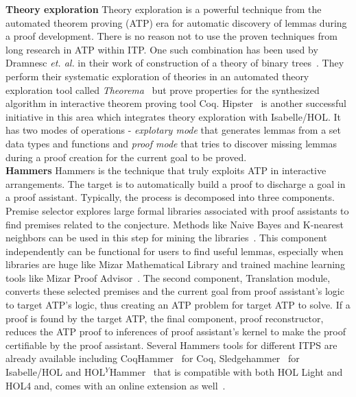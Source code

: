 \textbf{Theory exploration} Theory exploration is a powerful technique from the automated theorem proving (ATP) era for automatic discovery of lemmas during a proof development. There is no reason not to use the proven techniques from long research in ATP within ITP. One such combination has been used by Dramnesc \emph{et. al.} in their work of construction of a theory of binary trees~\cite{Dramnesc_et_al_2015}. They perform their systematic exploration of theories in an automated theory exploration tool called \emph{Theorema}~\cite{Buchberger_et_al_2006} but prove properties for the synthesized algorithm in interactive theorem proving tool Coq. Hipster~\cite{Johansson_et_al_2014} is another successful initiative in this area which integrates theory exploration with Isabelle/HOL. It has two modes of operations - \emph{explotary mode} that generates lemmas from a set data types and functions and \emph{proof mode} that tries to discover missing lemmas during a proof creation for the current goal to be proved. \\


\textbf{Hammers} Hammers is the technique that truly exploits ATP in interactive arrangements. The target is to automatically build a proof to discharge a goal in a proof assistant. Typically, the process is decomposed into three components. Premise selector explores large formal libraries associated with proof assistants to find premises related to the conjecture. Methods like Naive Bayes and K-nearest neighbors can be used in this step for mining the libraries~\cite{Blanchette_et_al_2016}. This component independently can be functional for users to find useful lemmas, especially when libraries are huge like Mizar Mathematical Library and trained machine learning tools like Mizar Proof Advisor~\cite{Urban_2004}. The second component, Translation module, converts these selected premises and the current goal from proof assistant's logic to target ATP's logic, thus creating an ATP problem for target ATP to solve. If a proof is found by the target ATP, the final component, proof reconstructor, reduces the ATP proof to inferences of proof assistant's kernel to make the proof certifiable by the proof assistant. Several Hammers tools for different ITPS are already available including CoqHammer~\cite{Czajka_Kaliszyk_2018} for Coq, Sledgehammer~\cite{Paulson_et_al_2015} for Isabelle/HOL and HOL$^Y$Hammer~\cite{Kaliszyk_et_al_2014} that is compatible with both HOL Light and HOL4 and, comes with an online extension as well~\cite{Kaliszyk_et_al_2015}.  

